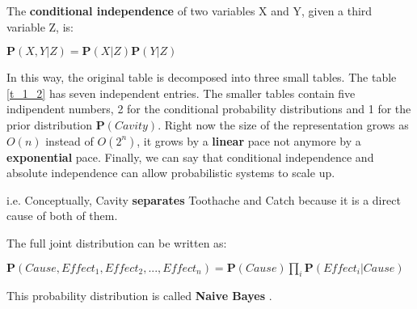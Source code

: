 \begin{definition}
    The \textbf{conditional independence} of two variables X and Y, given a third variable Z, is:
    \begin{center}
        $\mathbf{P}(X,Y|Z)=\mathbf{P}(X|Z)\mathbf{P}(Y|Z)$
    \end{center}
\end{definition}
In this way, the original table is decomposed into three small tables. The table \ref{t_1_2} has seven independent entries. The smaller tables contain five indipendent numbers, 2 for the conditional probability distributions and 1 for the prior distribution $\mathbf{P}(Cavity)$. Right now the size of the representation grows as $O(n)$ instead of $O(2^n)$, it grows by a \textbf{linear} pace not anymore by a \textbf{exponential} pace. Finally, we can say that conditional independence and absolute independence can allow probabilistic systems to scale up.
\begin{example}
    i.e. Conceptually, Cavity \textbf{separates} Toothache and Catch because it is a direct cause of both of them.
\end{example}
\begin{definition}
    The full joint distribution can be written as: \vspace{3.5pt}

    \begin{center}
        $\mathbf{P}(Cause, Effect_1, Effect_2, ..., Effect_n) = \mathbf{P}(Cause)\prod_i\mathbf{P}(Effect_i|Cause)$
    \end{center} \vspace{3.5pt}

    This probability distribution is called \textbf{Naive Bayes} .
\end{definition}